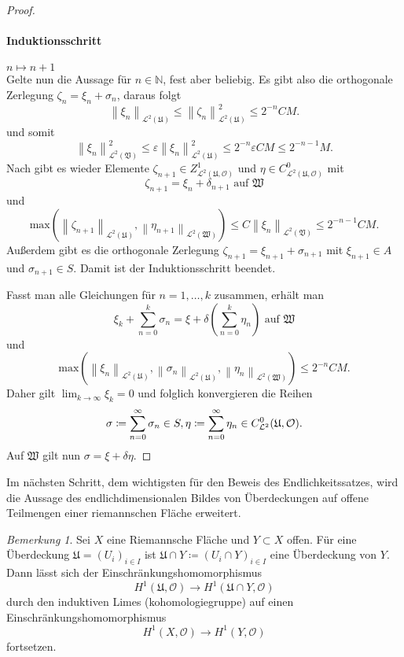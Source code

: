 \documentclass[11pt,a4paper]{scrartcl}
\theoremstyle{thm}
\theoremstyle{def}
\theoremstyle{remark}
\newtheorem*{bem}{Bemerkung}
\newcommand{\norm}[1]{\left\lVert#1\right\rVert}
\begin{document}
\begin{proof}
\paragraph*{Induktionsschritt} $n\mapsto n+1$\\
Gelte nun die Aussage für $n\in\mathbb{N}$, fest aber beliebig. Es gibt also die orthogonale Zerlegung $\zeta_n=\xi_n+\sigma_n$, daraus folgt
\[
\norm{\xi_n}_{\mathcal{L}^2(\mathfrak{U})}\leq \norm{\zeta_n}_{\mathcal{L}^2(\mathfrak{U})}^2\leq 2^{-n}CM.
\]
und somit
\[
\norm{\xi_n}_{\mathcal{L}^2(\mathfrak{V})}^2\leq \varepsilon \norm{\xi_n}_{\mathcal{L}^2(\mathfrak{U})}^2 \leq 2^{-n}\varepsilon CM\leq
2^{-n-1}M.
\]
Nach  gibt es wieder Elemente $\zeta_{n+1}\in Z^1_{\mathcal{L}^2(\mathfrak{U},\mathcal{O})}$ und $\eta\in C^0_{\mathcal{L}^2(\mathfrak{U},\mathcal{O})}$ mit
\[
\zeta_{n+1}=\xi_n+\delta_{n+1}\text{ auf } \mathfrak{W}
\]
und 
\[
\mathrm{max}(\norm{\zeta_{n+1}}_{\mathcal{L}^2(\mathfrak{U})},\norm{\eta_{n+1}}_{\mathcal{L}^2(\mathfrak{W})})\leq C\norm{\xi_n}_{\mathcal{L}^2(\mathfrak{V})}\leq 2^{-n-1}CM.
\]
Außerdem gibt es die orthogonale Zerlegung $\zeta_{n+1}=\xi_{n+1}+\sigma_{n+1}$ mit $\xi_{n+1}\in A$ und $\sigma_{n+1}\in S$. Damit ist der Induktionsschritt beendet.\par
Fasst man alle Gleichungen für $n=1,\ldots,k$ zusammen, erhält man 
\[
\xi_k+\sum_{n=0}^k \sigma_n = \xi+\delta\left(\sum_{n=0}^k \eta_n\right)\text{ auf } \mathfrak{W}
\]
und
\[
\mathrm{max}(\norm{\xi_n}_{\mathcal{L}^2(\mathfrak{U})},\norm{\sigma_n}_{\mathcal{L}^2(\mathfrak{U})},\norm{\eta_n}_{\mathcal{L}^2(\mathfrak{W})})\leq 2^{-n}CM.
\]
Daher gilt $\lim_{k\rightarrow\infty}\xi_k=0$ und folglich konvergieren die Reihen 
\[
\sigma \coloneqq \sum_{n=0}^{\infty}\sigma_n\in S,\\
\eta \coloneqq \sum_{n=0}^{\infty}\eta_n\in C^0_{\mathcal{L}^2}(\mathfrak{U},\mathcal{O}).
\]
Auf $\mathfrak{W}$ gilt nun $\sigma = \xi +\delta\eta.$
\end{proof}
Im nächsten Schritt, dem wichtigsten für den Beweis des Endlichkeitssatzes, wird die Aussage des endlichdimensionalen Bildes von Überdeckungen auf offene Teilmengen einer riemannschen Fläche erweitert.
\begin{bem}
Sei $X$ eine Riemannsche Fläche und $Y\subset X$ offen. Für eine Überdeckung $\mathfrak{U}=(U_i)_{i\in I}$ ist $\mathfrak{U}\cap Y\coloneqq (U_i\cap Y)_{i\in I}$ eine Überdeckung von $Y$. Dann lässt sich der Einschränkungshomomorphismus 
\[
H^1(\mathfrak{U},\mathcal{O})\rightarrow H^1(\mathfrak{U}\cap Y,\mathcal{O})
\]
durch den induktiven Limes \thref(kohomologiegruppe) auf einen Einschränkungshomomorphismus 
\[
H^1(X,\mathcal{O})\rightarrow H^1(Y,\mathcal{O})
\]
fortsetzen.
\end{bem}
\end{document}
